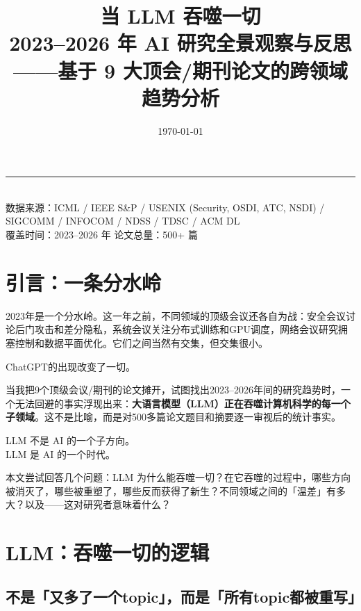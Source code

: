 \documentclass[12pt,a4paper]{ctexart}
\title{
    {\Huge\bfseries 当 LLM 吞噬一切}\\[8pt]
    {\Large 2023--2026 年 AI 研究全景观察与反思}\\[12pt]
    {\normalsize ——基于 9 大顶会/期刊论文的跨领域趋势分析}
}
\author{}
\date{\today}
\begin{document}
\maketitle

\begin{center}
\rule{0.6\textwidth}{0.5pt}\\[6pt]
{\small
数据来源：ICML / IEEE S\&P / USENIX (Security, OSDI, ATC, NSDI) /
SIGCOMM / INFOCOM / NDSS / TDSC / ACM DL \\
覆盖时间：2023--2026 年  \quad  论文总量：500+ 篇
}
\end{center}

\vspace{10pt}

\section{引言：一条分水岭}

2023年是一个分水岭。这一年之前，不同领域的顶级会议还各自为战：安全会议讨论后门攻击和差分隐私，系统会议关注分布式训练和GPU调度，网络会议研究拥塞控制和数据平面优化。它们之间当然有交集，但交集很小。

ChatGPT的出现改变了一切。

当我把9个顶级会议/期刊的论文摊开，试图找出2023--2026年间的研究趋势时，一个无法回避的事实浮现出来：\textbf{大语言模型（LLM）正在吞噬计算机科学的每一个子领域}。这不是比喻，而是对500多篇论文题目和摘要逐一审视后的统计事实。

\begin{quotebox}
LLM 不是 AI 的一个子方向。\\
LLM 是 AI 的一个时代。
\end{quotebox}

本文尝试回答几个问题：LLM 为什么能吞噬一切？在它吞噬的过程中，哪些方向被消灭了，哪些被重塑了，哪些反而获得了新生？不同领域之间的「温差」有多大？以及——这对研究者意味着什么？

\section{LLM：吞噬一切的逻辑}

\subsection{不是「又多了一个topic」，而是「所有topic都被重写」}
\end{document}
